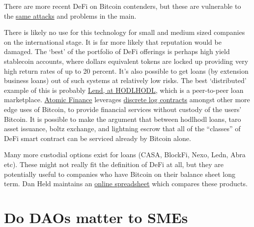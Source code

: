There are more recent DeFi on Bitcoin contenders, but these are vulnerable to the \href{https://bisq.community/t/trading-halted-until-v1-3-0-hotfix/9208}{same attacks} and problems in the main. \par 
There is likely no use for this technology for small and medium sized companies on the international stage. It is far more likely that reputation would be damaged. The `best' of the portfolio of DeFi offerings is perhaps high yield stablecoin accounts, where dollars equivalent tokens are locked up providing very high return rates of up to 20 percent. It's also possible to get loans (by extension business loans) out of such systems at relatively low risks. The best `distributed' example of this is probably \href{https://lend.hodlhodl.com/}{Lend, at HODLHODL}, which is a peer-to-peer loan marketplace. \href{https://atomic.finance/blog/a-laypersons-guide-to-discreet-log-contracts-atomic-yield-series-part-3/}{Atomic Finance} leverages \href{https://adiabat.github.io/dlc.pdf}{discrete log contracts} amongst other more edge uses of Bitcoin, to provide financial services without custody of the users' Bitcoin. It is possible to make the argument that between hodlhodl loans, taro asset issuance, boltz exchange, and lightning escrow that all of the ``classes'' of DeFi smart contract can be serviced already by Bitcoin alone.\par
Many more custodial options exist for loans (CASA, BlockFi, Nexo, Ledn, Abra etc). These might not really fit the definition of DeFi at all, but they are potentially useful to companies who have Bitcoin on their balance sheet long term. Dan Held maintains an \href{https://docs.google.com/spreadsheets/d/1ZoapTCl76wahFMeNISSx9UdC3QBx-zC_jY4Le1H5Sdg/htmlview#}{online spreadsheet} which compares these products.\par
\section{Do DAOs matter to SMEs}
